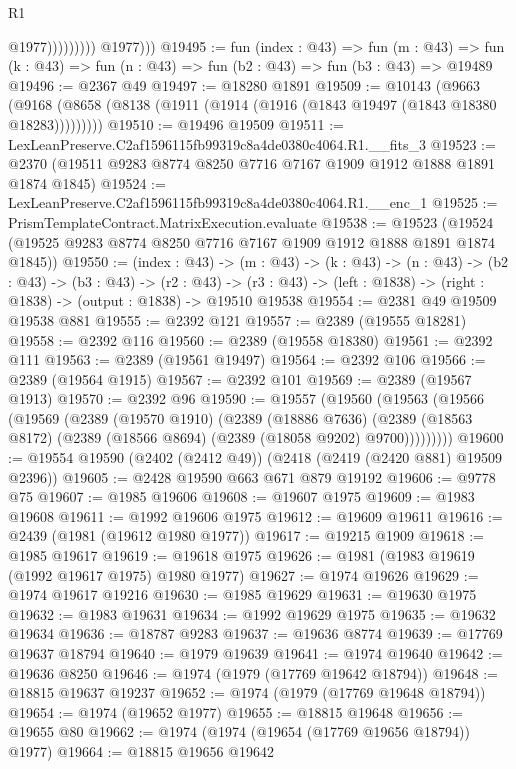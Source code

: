 \begin{lexlean}{R1}
\begin{coremodule}
                            @1977)))))))))
          @1977)))
@19495 := fun (index : @43) =>
  fun (m : @43) => fun (k : @43) => fun (n : @43) => fun (b2 : @43) => fun (b3 : @43) => @19489
@19496 := @2367 @49
@19497 := @18280 @1891
@19509 := @10143
    (@9663 (@9168 (@8658 (@8138 (@1911 (@1914 (@1916 (@1843 @19497 (@1843 @18380 @18283)))))))))
@19510 := @19496 @19509
@19511 := LexLeanPreserve.C2af1596115fb99319c8a4de0380c4064.R1.__fits_3
@19523 := @2370 (@19511 @9283 @8774 @8250 @7716 @7167 @1909 @1912 @1888 @1891 @1874 @1845)
@19524 := LexLeanPreserve.C2af1596115fb99319c8a4de0380c4064.R1.__enc_1
@19525 := PrismTemplateContract.MatrixExecution.evaluate
@19538 := @19523 (@19524 (@19525 @9283 @8774 @8250 @7716 @7167 @1909 @1912 @1888 @1891 @1874 @1845))
@19550 := (index : @43) ->
  (m : @43) ->
  (k : @43) ->
  (n : @43) ->
  (b2 : @43) ->
  (b3 : @43) ->
  (r2 : @43) -> (r3 : @43) -> (left : @1838) -> (right : @1838) -> (output : @1838) -> @19510 @19538
@19554 := @2381 @49 @19509 @19538 @881
@19555 := @2392 @121
@19557 := @2389 (@19555 @18281)
@19558 := @2392 @116
@19560 := @2389 (@19558 @18380)
@19561 := @2392 @111
@19563 := @2389 (@19561 @19497)
@19564 := @2392 @106
@19566 := @2389 (@19564 @1915)
@19567 := @2392 @101
@19569 := @2389 (@19567 @1913)
@19570 := @2392 @96
@19590 := @19557
    (@19560
      (@19563
        (@19566
          (@19569
            (@2389
              (@19570 @1910)
              (@2389
                (@18886 @7636)
                (@2389 (@18563 @8172) (@2389 (@18566 @8694) (@2389 (@18058 @9202) @9700)))))))))
@19600 := @19554 @19590 (@2402 (@2412 @49)) (@2418 (@2419 (@2420 @881) @19509 @2396))
@19605 := @2428 @19590 @663 @671 @879 @19192
@19606 := @9778 @75
@19607 := @1985 @19606
@19608 := @19607 @1975
@19609 := @1983 @19608
@19611 := @1992 @19606 @1975
@19612 := @19609 @19611
@19616 := @2439 (@1981 (@19612 @1980 @1977))
@19617 := @19215 @1909
@19618 := @1985 @19617
@19619 := @19618 @1975
@19626 := @1981 (@1983 @19619 (@1992 @19617 @1975) @1980 @1977)
@19627 := @1974 @19626
@19629 := @1974 @19617 @19216
@19630 := @1985 @19629
@19631 := @19630 @1975
@19632 := @1983 @19631
@19634 := @1992 @19629 @1975
@19635 := @19632 @19634
@19636 := @18787 @9283
@19637 := @19636 @8774
@19639 := @17769 @19637 @18794
@19640 := @1979 @19639
@19641 := @1974 @19640
@19642 := @19636 @8250
@19646 := @1974 (@1979 (@17769 @19642 @18794))
@19648 := @18815 @19637 @19237
@19652 := @1974 (@1979 (@17769 @19648 @18794))
@19654 := @1974 (@19652 @1977)
@19655 := @18815 @19648
@19656 := @19655 @80
@19662 := @1974 (@1974 (@19654 (@17769 @19656 @18794)) @1977)
@19664 := @18815 @19656 @19642

\end{coremodule}
\end{lexlean}
